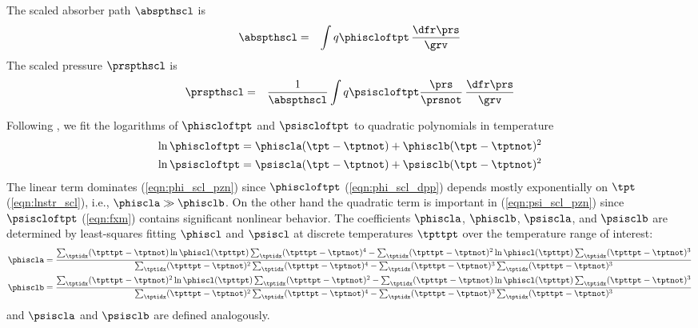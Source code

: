 \documentclass[12pt]{article}
\begin{document}
The scaled absorber path $\abspthscl$ is
\begin{eqnarray}
\abspthscl & = & \int q \phiscloftpt \, \frac{\dfr\prs}{\grv}
\label{eqn:abs_pth_scl_dfn2}
\end{eqnarray}
The scaled pressure $\prspthscl$ is
\begin{eqnarray}
\prspthscl & = & \frac{1}{\abspthscl}
\int q \psiscloftpt \frac{\prs}{\prsnot} \, \frac{\dfr\prs}{\grv}
\label{eqn:prs_pth_scl_dfn}
\end{eqnarray}

Following \cite{RoW66}, we fit the logarithms of $\phiscloftpt$
and $\psiscloftpt$ to quadratic polynomials in temperature
\begin{subequations}
\label{eqn:phi_psi_scl_pzn}
\begin{align}
\label{eqn:phi_scl_pzn}
\ln \phiscloftpt & =  
\phiscla (\tpt - \tptnot) +  \phisclb (\tpt - \tptnot)^{2} \\
\label{eqn:psi_scl_pzn}
\ln \psiscloftpt & =  
\psiscla (\tpt - \tptnot) +  \psisclb (\tpt - \tptnot)^{2}
\end{align}
\end{subequations}
The linear term dominates (\ref{eqn:phi_scl_pzn}) since $\phiscloftpt$ 
(\ref{eqn:phi_scl_dpp}) depends mostly exponentially on 
$\tpt$ (\ref{eqn:lnstr_scl}), i.e., $\phiscla \gg \phisclb$.
On the other hand the quadratic term is important in
(\ref{eqn:psi_scl_pzn}) since $\psiscloftpt$ (\ref{eqn:fxm}) 
contains significant nonlinear behavior.
The coefficients $\phiscla$, $\phisclb$, $\psiscla$, and $\psisclb$ 
are determined by least-squares fitting $\phiscl$ and $\psiscl$ at
discrete temperatures $\tpttpt$ over the temperature range of
interest: 
\begin{subequations}
\label{eqn:phi_psi_scl_cff}
\begin{align}
\label{eqn:phi_psi_scl_cff_a}
\phiscla & = 
\frac{
\sum_{\tptidx} (\tpttpt-\tptnot) \ln \phiscl(\tpttpt)
\sum_{\tptidx} (\tpttpt-\tptnot)^{4} - 
\sum_{\tptidx} (\tpttpt-\tptnot)^{2} \ln \phiscl(\tpttpt)
\sum_{\tptidx} (\tpttpt-\tptnot)^{3}
}{
\sum_{\tptidx} (\tpttpt-\tptnot)^{2}
\sum_{\tptidx} (\tpttpt-\tptnot)^{4} - 
\sum_{\tptidx} (\tpttpt-\tptnot)^{3}
\sum_{\tptidx} (\tpttpt-\tptnot)^{3}
} \\
\label{eqn:phi_psi_scl_cff_b}
\phisclb & = 
\frac{
\sum_{\tptidx} (\tpttpt-\tptnot)^{2} \ln \phiscl(\tpttpt)
\sum_{\tptidx} (\tpttpt-\tptnot)^{2} - 
\sum_{\tptidx} (\tpttpt-\tptnot) \ln \phiscl(\tpttpt)
\sum_{\tptidx} (\tpttpt-\tptnot)^{3}
}{
\sum_{\tptidx} (\tpttpt-\tptnot)^{2}
\sum_{\tptidx} (\tpttpt-\tptnot)^{4} - 
\sum_{\tptidx} (\tpttpt-\tptnot)^{3}
\sum_{\tptidx} (\tpttpt-\tptnot)^{3}
}
\end{align}
\end{subequations}
and $\psiscla$ and $\psisclb$ are defined analogously.
\end{document}
